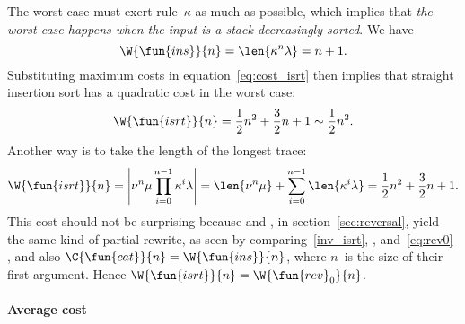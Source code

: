 The worst case must exert rule~\(\kappa\) as much as possible, which
implies that \emph{the worst case happens when the input is a stack
  decreasingly sorted}. We have
\begin{equation*}
\W{\fun{ins}}{n} = \len{\kappa^n\lambda} = n + 1.
\end{equation*}
Substituting maximum costs in equation~\eqref{eq:cost_isrt} then
implies that straight insertion sort has a quadratic cost in the worst
case:
\begin{equation*}
\W{\fun{isrt}}{n} = \frac{1}{2}{n^2} + \frac{3}{2}{n} + 1
\sim \frac{1}{2}{n^2}.
\end{equation*}
Another way is to take the length of the longest trace:
\begin{equation*}
\W{\fun{isrt}}{n}
 = \left\lvert\nu^n\mu \prod_{i=0}^{n-1}\kappa^i\lambda\right\rvert
 = \len{\nu^n\mu} + \sum_{i=0}^{n-1}\len{\kappa^i\lambda}
 = \frac{1}{2}{n^2} + \frac{3}{2}{n} + 1.
\end{equation*}
This cost should not be surprising because
 and
, in
section~\ref{sec:reversal}, yield the same kind of partial rewrite, as
seen by comparing~\eqref{inv_isrt}, ,
and~\eqref{eq:rev0} , and also \(\C{\fun{cat}}{n} =
\W{\fun{ins}}{n}\),
where \(n\)~is the size of their first argument. Hence
\(\W{\fun{isrt}}{n} = \W{\fun{rev}_0}{n}\).

\paragraph{Average cost}
\label{par:ave_isrt}

